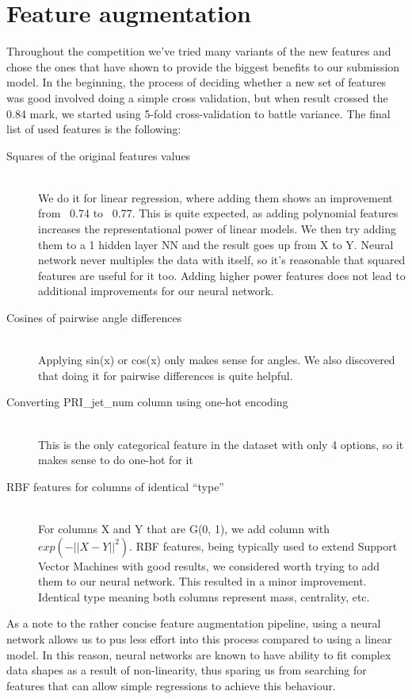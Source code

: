 \documentclass[10pt,conference,compsocconf]{IEEEtran}
\begin{document}
\section{Feature augmentation}
Throughout the competition we've tried many variants of the new features and chose the ones that have shown to provide the biggest benefits to our submission model. In the beginning, the process of deciding whether a new set of features was good involved doing a simple cross validation, but when result crossed the 0.84 mark, we started using 5-fold cross-validation to battle variance. The final list of used features is the following:
\begin{description}
\item[Squares of the original features values] \ \\
	We do it for linear regression, where adding them shows an improvement from ~0.74 to ~0.77. This is quite expected, as adding polynomial features increases the representational power of linear models. We then try adding them to a 1 hidden layer NN and the result goes up from X to Y. Neural network never multiples the data with itself, so it's reasonable that squared features are useful for it too. Adding higher power features does not lead to additional improvements for our neural network.
	
\item[Cosines of pairwise angle differences] \ \\
	Applying sin(x) or cos(x) only makes sense for angles. We also discovered that doing it for pairwise differences is quite helpful.
	
\item[Converting PRI\_jet\_num column using one-hot encoding] \ \\
	This is the only categorical feature in the dataset with only 4 options, so it makes sense to do one-hot for it
	
\item[RBF features for columns of identical “type”] \ \\
	For columns X and Y that are G(0, 1), we add column with $exp(-||X-Y||^2)$. 
	RBF features, being typically used to extend Support Vector Machines with good results, we considered worth trying to add them to our neural network. This resulted in a minor improvement.
	Identical type meaning both columns represent mass, centrality, etc.
\end{description}

As a note to the rather concise feature augmentation pipeline, using a neural network allows us to pus less effort into this process compared to using a linear model. In this reason, neural networks are known to have ability to fit complex data shapes as a result of non-linearity, thus sparing us from searching for features that can allow simple regressions to achieve this behaviour.





\end{document}
